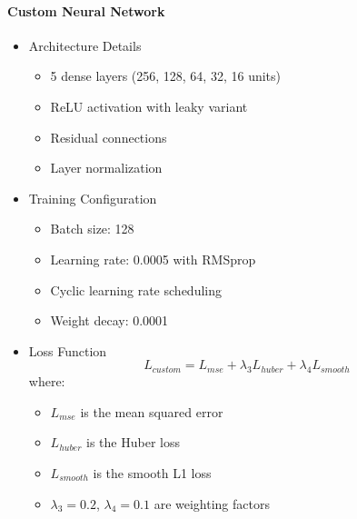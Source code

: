 \documentclass[conference]{IEEEtran}
\begin{document}
\paragraph{Custom Neural Network}
\begin{itemize}
    \item Architecture Details
    \begin{itemize}
        \item 5 dense layers (256, 128, 64, 32, 16 units)
        \item ReLU activation with leaky variant
        \item Residual connections
        \item Layer normalization
    \end{itemize}
    
    \item Training Configuration
    \begin{itemize}
        \item Batch size: 128
        \item Learning rate: 0.0005 with RMSprop
        \item Cyclic learning rate scheduling
        \item Weight decay: 0.0001
    \end{itemize}
    
    \item Loss Function
    \begin{equation}
    L_{custom} = L_{mse} + \lambda_3 L_{huber} + \lambda_4 L_{smooth}
    \end{equation}
    where:
    \begin{itemize}
        \item $L_{mse}$ is the mean squared error
        \item $L_{huber}$ is the Huber loss
        \item $L_{smooth}$ is the smooth L1 loss
        \item $\lambda_3 = 0.2$, $\lambda_4 = 0.1$ are weighting factors
    \end{itemize}
\end{itemize}
\end{document}
